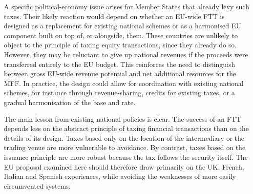 \documentclass[../../main]{subfiles}
\begin{document}
A specific political-economy issue arises for Member States that already levy such taxes. Their likely reaction would depend on whether an EU-wide FTT is designed as a replacement for existing national schemes or as a harmonised EU component built on top of, or alongside, them. These countries are unlikely to object to the principle of taxing equity transactions, since they already do so. However, they may be reluctant to give up national revenues if the proceeds were transferred entirely to the EU budget. This reinforces the need to distinguish between gross EU-wide revenue potential and net additional resources for the MFF. In practice, the design could allow for coordination with existing national schemes, for instance through revenue-sharing, credits for existing taxes, or a gradual harmonisation of the base and rate.

The main lesson from existing national policies is clear. The success of an FTT depends less on the abstract principle of taxing financial transactions than on the details of its design. Taxes based only on the location of the intermediary or the trading venue are more vulnerable to avoidance. By contrast, taxes based on the issuance principle are more robust because the tax follows the security itself. The EU proposal examined here should therefore draw primarily on the UK, French, Italian and Spanish experiences, while avoiding the weaknesses of more easily circumvented systems.
\end{document}
